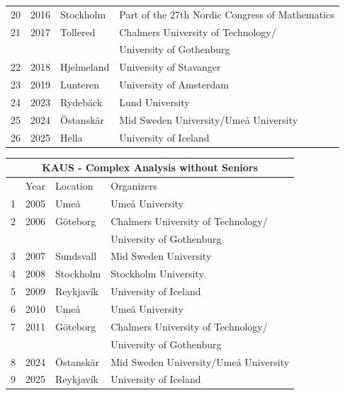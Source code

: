 \documentclass[12pt, openany]{report}      %
\begin{document}
\begin{center}
\begin{tabular}{llll}
        20 & 2016 & Stockholm & Part of the 27th Nordic Congress of Mathematics\\
        21 & 2017 & Tollered & Chalmers University of Technology/\\
           &      &               & University of Gothenburg\\
        22 & 2018 & Hjelmeland & University of Stavanger\\
        23 & 2019 & Lunteren & University of Amsterdam\\
        24 & 2023 & Rydebäck & Lund University\\
        25 & 2024 & Östanskär & Mid Sweden University/Umeå University\\
        26 & 2025 & Hella & University of Iceland\\
        \bottomrule
    \end{tabular}
\end{center}
    
\begin{center}
    \begin{tabular}{llll}
        \toprule
        \multicolumn{4}{c}{KAUS - Complex Analysis without Seniors}\\
        \midrule
         & Year & Location & Organizers \\
         \midrule
        1 & 2005 & Umeå & Umeå University\\
        2 & 2006 & Göteborg  & Chalmers University of Technology/\\
          &      &               & University of Gothenburg \\
        3 & 2007 & Sundsvall & Mid Sweden University\\
        4 & 2008 & Stockholm & Stockholm University  \\
        5 & 2009 & Reykjavík & University of Iceland\\
        6 & 2010 & Umeå & Umeå University\\
        7 & 2011 & Göteborg & Chalmers University of Technology/\\
           &      &               & University of Gothenburg\\
        8 & 2024 & Östanskär & Mid Sweden University/Umeå University\\
        9 & 2025 & Reykjavík & University of Iceland\\
        \bottomrule
    \end{tabular}
\end{center}
\end{document}
